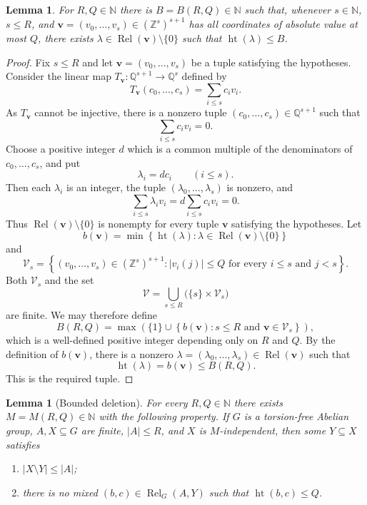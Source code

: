 \documentclass[11pt]{amsart}
\newtheorem{lemma}[theorem]{Lemma}
\theoremstyle{definition}
\newcommand{\N}{\mathbb N}
\newcommand{\Z}{\mathbb Z}
\newcommand{\Q}{\mathbb Q}
\newcommand{\Rel}{\operatorname{Rel}}
\newcommand{\htop}{\operatorname{ht}}
\begin{document}
\begin{lemma}\label{lem:integer-dependence}
For $R,Q\in\N$ there is $B=B(R,Q)\in\N$ such that, whenever
$s\in\N$, $s\leq R$, and
$\mathbf v=(v_0,\ldots,v_s)\in(\Z^s)^{s+1}$ has all coordinates of
absolute value at most $Q$, there exists
$\lambda\in\Rel(\mathbf v)\setminus\{0\}$ such that
$\htop(\lambda)\leq B$.
\end{lemma}
\begin{proof}
Fix $s\leq R$ and let $\mathbf v=(v_0,\ldots,v_s)$ be a tuple satisfying
the hypotheses.  Consider the linear map
$T_{\mathbf v}:\Q^{s+1}\longrightarrow\Q^s$
defined by
\[
T_{\mathbf v}(c_0,\ldots,c_s)
   =\sum_{i\le s}c_i v_i.
\]
As $T_{\mathbf v}$ cannot be injective, there
is a nonzero tuple $(c_0,\ldots,c_s)\in\Q^{s+1}$
such that
\[
\sum_{i\le s}c_i v_i=0.
\]
Choose a positive integer $d$ which is a common multiple of the
denominators of $c_0,\ldots,c_s$, and put
\[
\lambda_i=dc_i
\qquad(i\le s).
\]
Then each $\lambda_i$ is an integer, the tuple
$(\lambda_0,\ldots,\lambda_s)$ is nonzero, and
\[
\sum_{i\le s}\lambda_i v_i
   =d\sum_{i\le s}c_i v_i
   =0.
\]
Thus $\Rel(\mathbf v)\setminus\{0\}$ is nonempty for every tuple
$\mathbf v$ satisfying the hypotheses.  Let
\[
b(\mathbf v)=
\min\left\{
 \htop(\lambda):
 \lambda\in\Rel(\mathbf v)\setminus\{0\}
\right\}
\]
and
\[
\mathcal V_s=
\left\{
 (v_0,\ldots,v_s)\in(\Z^s)^{s+1}:
 |v_i(j)|\le Q
 \text{ for every }i\le s\text{ and }j<s
\right\}.
\]
Both $\mathcal V_s$ and the set
\[
\mathcal V=
\bigcup_{s\le R}\bigl(\{s\}\times\mathcal V_s\bigr)
\]
are finite.  We may therefore define
\[
B(R,Q)=
\max\left(
 \{1\}\cup
 \left\{
 b(\mathbf v):
 s\le R\text{ and }\mathbf v\in\mathcal V_s
 \right\}
\right),
\]
which is a well-defined positive integer depending only on $R$ and
$Q$.
By the definition of
$b(\mathbf v)$, there is a nonzero
$\lambda=(\lambda_0,\ldots,\lambda_s)\in
\Rel(\mathbf v)$ such that
\[
\htop(\lambda)=b(\mathbf v)\le B(R,Q).
\]
This is the required tuple.
\end{proof}

\begin{lemma}[Bounded deletion]\label{lem:bounded-deletion}
For every $R,Q\in\N$ there exists $M=M(R,Q)\in\N$ with the following
property.  If $G$ is a torsion-free Abelian group, $A,X\subseteq G$ are
finite, $|A|\leq R$, and $X$ is
$M$-independent, then some $Y\subseteq X$ satisfies
\begin{enumerate}
\item $|X\setminus Y|\leq|A|$;
\item there is no mixed $(b,c)\in\Rel_G(A,Y)$ such that
$\htop(b,c)\leq Q$.
\end{enumerate}
\end{lemma}
\end{document}
